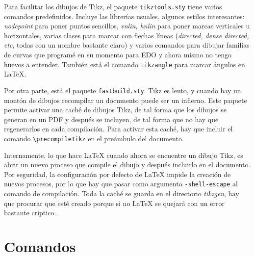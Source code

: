 \documentclass[nochap]{apuntes}
\begin{document}
Para facilitar los dibujos de Tikz, el paquete \texttt{tikztools.sty} tiene varios comandos predefinidos. Incluye las librerías usuales, algunos estilos interesantes: \textit{nodepoint} para poner puntos sencillos, \textit{vnlin, hnlin} para poner marcas verticales u horizontales, varias clases para marcar con flechas líneas (\textit{directed, dense directed, etc}, todas con un nombre bastante claro) y varios comandos para dibujar familias de curvas que programé en su momento para EDO y ahora mismo no tengo huevos a entender. También está el comando \texttt{tikzangle} para marcar ángulos en LaTeX.

Por otra parte, está el paquete \texttt{fastbuild.sty}. Tikz es lento, y cuando hay un montón de dibujos recompilar un documento puede ser un infierno. Este paquete permite activar una caché de dibujos Tikz, de tal forma que los dibujos se generan en un PDF y después se incluyen, de tal forma que no hay que regenerarlos en cada compilación. Para activar esta caché, hay que incluir el comando \verb|\precompileTikz| en el preámbulo del documento.

Internamente, lo que hace LaTeX cuando ahora se encuentre un dibujo Tikz, es abrir un nuevo proceso que compile el dibujo y después incluirlo en el documento. Por seguridad, la configuración por defecto de LaTeX impide la creación de nuevos procesos, por lo que hay que pasar como argumento \texttt{-shell-escape} al comando de compilación. Toda la caché se guarda en el directorio \textit{tikzgen}, hay que procurar que esté creado porque si no LaTeX se quejará con un error bastante críptico.

\section{Comandos}

\setcounter{LTchunksize}{10}
\renewcommand{\arraystretch}{1.5}%


\newpage
\printindex
\end{document}
